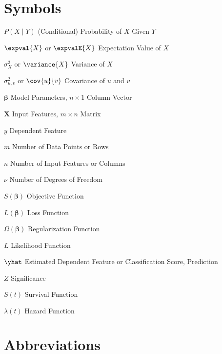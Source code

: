 \abbreviations

\section*{Symbols}

\begin{symbollist}
	\item[$P\left(X \mid Y\right)$] (Conditional) Probability of $X$ Given $Y$
	\item[$\expval{X}$ or $\expvalE{X}$] Expectation Value of $X$
	\item[$\sigma_{X}^{2}$ or $\variance{X}$] Variance of $X$
	\item[$\sigma_{u,v}^{2}$ or $\cov{u}{v}$] Covariance of $u$ and $v$
	\item[$\bm{\beta}$] Model Parameters, $n \times 1$ Column Vector
	\item[$\mathbf{X}$] Input Features, $m \times n$ Matrix
	\item[$y$] Dependent Feature
	\item[$m$] Number of Data Points or Rows
	\item[$n$] Number of Input Features or Columns
	\item[$\nu$] Number of Degrees of Freedom
	\item[$S\left(\bm{\beta}\right)$] Objective Function
	\item[$L\left(\bm{\beta}\right)$] Loss Function
	\item[$\Omega\left(\bm{\beta}\right)$] Regularization Function
	\item[$L$] Likelihood Function
	\item[$\yhat$] Estimated Dependent Feature or Classification Score, Prediction
	\item[$Z$] Significance
	\item[$S\left(t\right)$] Survival Function
	\item[$\lambda\left(t\right)$] Hazard Function
\end{symbollist}

\section*{Abbreviations}

